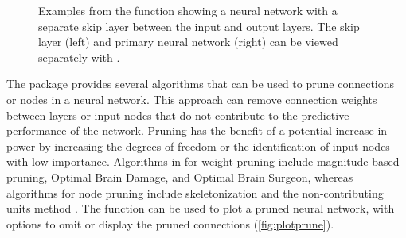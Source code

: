 \documentclass[article,shortnames]{jss}\usepackage[]{graphicx}\usepackage[]{color}
\newenvironment{knitrout}{}{} %
\begin{document}
\begin{knitrout}
\begin{figure}[!ht]
{}

\caption{Examples from the  function showing a neural network with a separate skip layer between the input and output layers.  The skip layer (left) and primary neural network (right) can be viewed separately with .}\label{fig:plotnet_skip}
\end{figure}


\end{knitrout}

The  package provides several algorithms that can be used to prune connections or nodes in a neural network.  This approach can remove connection weights between layers or input nodes that do not contribute to the predictive performance of the network.  Pruning has the benefit of a potential increase in power by increasing the degrees of freedom or the identification of input nodes with low importance.  Algorithms in  for weight pruning include magnitude based pruning, Optimal Brain Damage, and Optimal Brain Surgeon, whereas algorithms for node pruning include skeletonization and the non-contributing units method \citep{Zell98}.  The  function can be used to plot a pruned neural network, with options to omit or display the pruned connections (\cref{fig:plotprune}).  
\end{document}
